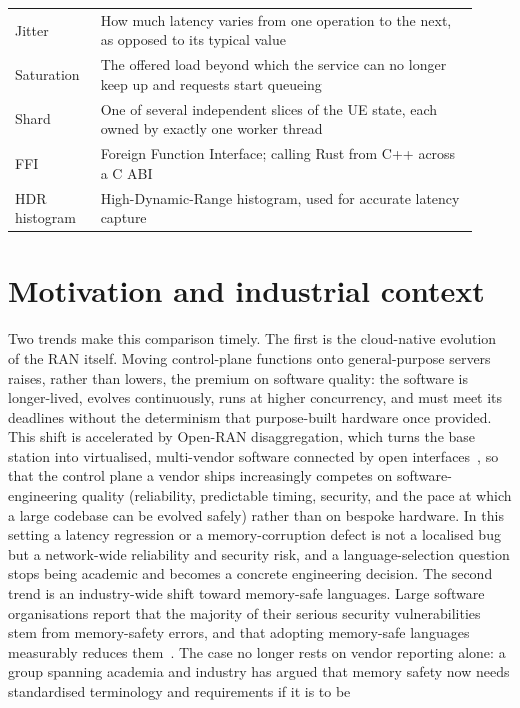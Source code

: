 \documentclass[english,twoside,openright,a4paper,censored,csm,software-track-2020]{HYthesisML}
\begin{document}
\begin{table}
\begin{tabular}{@{}p{0.17\linewidth} p{0.75\linewidth}@{}}
Jitter & How much latency varies from one operation to the next, as opposed to its typical value \\
Saturation & The offered load beyond which the service can no longer keep up and requests start queueing \\
Shard & One of several independent slices of the UE state, each owned by exactly one worker thread \\
FFI & Foreign Function Interface; calling Rust from C++ across a C ABI \\
HDR histogram & High-Dynamic-Range histogram, used for accurate latency capture \\
\hline
\end{tabular}
\end{table}

\section{Motivation and industrial context}
Two trends make this comparison timely. The first is the cloud-native evolution of the RAN
itself. Moving control-plane functions onto general-purpose servers raises, rather than
lowers, the premium on software quality: the software is longer-lived, evolves continuously,
runs at higher concurrency, and must meet its deadlines without the determinism that
purpose-built hardware once provided. This shift is accelerated by Open-RAN disaggregation,
which turns the base station into virtualised, multi-vendor software connected by open
interfaces~\cite{polese2023oran}, so that the control plane a vendor ships increasingly
competes on software-engineering quality (reliability, predictable timing, security, and the
pace at which a large codebase can be evolved safely) rather than on bespoke hardware. In
this setting a latency regression or a memory-corruption defect is not a localised bug but a
network-wide reliability and security risk, and a language-selection question stops being
academic and becomes a concrete engineering decision.
The second trend is an industry-wide shift toward memory-safe languages. Large
software organisations report that the majority of their serious security vulnerabilities
stem from memory-safety errors, and that adopting memory-safe languages measurably reduces
them~\cite{msrc2019memory,google2022android,vanderstoep2025android,google2024securebydesign}.
The case no longer rests on vendor reporting alone: a group spanning academia and industry has
argued that memory safety now needs standardised terminology and requirements if it is to be
\end{document}
